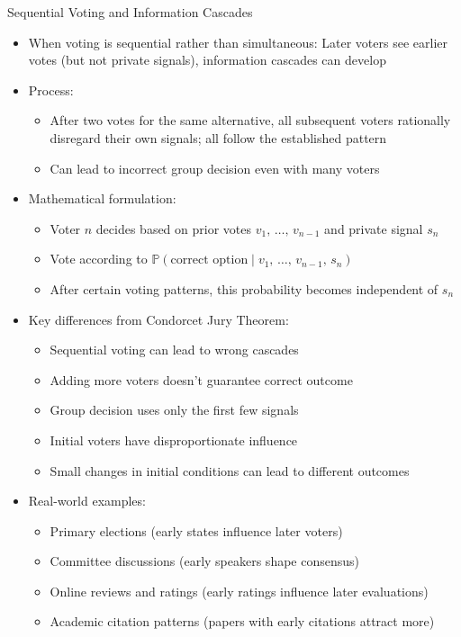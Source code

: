 \documentclass[10pt]{beamer}
\begin{document}
\begin{frame}{Sequential Voting and Information Cascades}
  \begin{itemize}[<+->]
    \item When voting is sequential rather than simultaneous: Later voters see earlier votes (but not private signals), information cascades can develop
    \item Process:
      \begin{itemize}
        \item After two votes for the same alternative, all subsequent voters rationally disregard their own signals; all follow the established pattern
        \item Can lead to incorrect group decision even with many voters
      \end{itemize}
    \item Mathematical formulation:
      \begin{itemize}
        \item Voter $n$ decides based on prior votes $v_1,\,\ldots,\,v_{n-1}$ and private signal $s_n$
        \item Vote according to $\mathbb{P}(\text{correct option} \mid v_1,\,\ldots,\,v_{n-1},\,s_n)$
        \item After certain voting patterns, this probability becomes independent of $s_n$
      \end{itemize}
    \item Key differences from Condorcet Jury Theorem:
      \begin{itemize}
        \item Sequential voting can lead to wrong cascades
        \item Adding more voters doesn't guarantee correct outcome
        \item Group decision uses only the first few signals
        \item Initial voters have disproportionate influence
        \item Small changes in initial conditions can lead to different outcomes
      \end{itemize}
    \item Real-world examples:
      \begin{itemize}
        \item Primary elections (early states influence later voters)
        \item Committee discussions (early speakers shape consensus)
        \item Online reviews and ratings (early ratings influence later evaluations)
        \item Academic citation patterns (papers with early citations attract more)
      \end{itemize}
  \end{itemize}
\end{frame}
\end{document}
